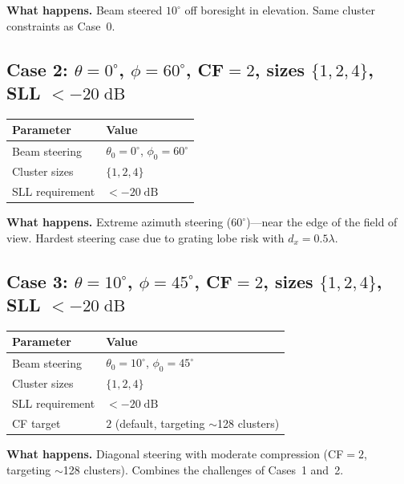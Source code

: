 \documentclass[11pt,a4paper]{article}
\begin{document}
\textbf{What happens.}
Beam steered $10^\circ$ off boresight in elevation.
Same cluster constraints as Case~0.

\subsection{Case 2: $\theta=0^\circ$, $\phi=60^\circ$, CF$=2$, sizes $\{1,2,4\}$, SLL $< -20\;\text{dB}$}

\begin{center}
\begin{tabular}{ll}
\toprule
\textbf{Parameter} & \textbf{Value} \\
\midrule
Beam steering & $\theta_0 = 0^\circ$, $\phi_0 = 60^\circ$ \\
Cluster sizes & $\{1, 2, 4\}$ \\
SLL requirement & $< -20\;\text{dB}$ \\
\bottomrule
\end{tabular}
\end{center}

\textbf{What happens.}
Extreme azimuth steering ($60^\circ$)---near the edge of the field of view.
Hardest steering case due to grating lobe risk with $d_x = 0.5\lambda$.

\subsection{Case 3: $\theta=10^\circ$, $\phi=45^\circ$, CF$=2$, sizes $\{1,2,4\}$, SLL $< -20\;\text{dB}$}

\begin{center}
\begin{tabular}{ll}
\toprule
\textbf{Parameter} & \textbf{Value} \\
\midrule
Beam steering & $\theta_0 = 10^\circ$, $\phi_0 = 45^\circ$ \\
Cluster sizes & $\{1, 2, 4\}$ \\
SLL requirement & $< -20\;\text{dB}$ \\
CF target & $2$ (default, targeting $\sim$128 clusters) \\
\bottomrule
\end{tabular}
\end{center}

\textbf{What happens.}
Diagonal steering with moderate compression (CF$=2$, targeting $\sim$128 clusters).
Combines the challenges of Cases~1 and~2.
\end{document}
